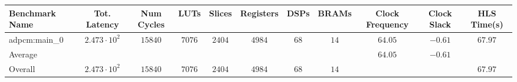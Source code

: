 \begin{tabular}{|l|c|c|c|c|c|c|c|c|c|c|}
\hline
Benchmark Name & Tot. Latency           & Num Cycles & LUTs     & Slices   & Registers & DSPs   & BRAMs  & Clock Frequency & Clock Slack & HLS Time(s) \\
\hline
adpcm:main\_0  & $ 2.473 \cdot 10^{2} $ & $ 15840  $ & $ 7076 $ & $ 2404 $ & $ 4984  $ & $ 68 $ & $ 14 $ & $ 64.05       $ & $ -0.61   $ & $ 67.97   $ \\
\hline
Average        & $                    $ & $        $ & $      $ & $      $ & $       $ & $    $ & $    $ & $ 64.05       $ & $ -0.61   $ & $         $ \\
\hline
Overall        & $ 2.473 \cdot 10^{2} $ & $ 15840  $ & $ 7076 $ & $ 2404 $ & $ 4984  $ & $ 68 $ & $ 14 $ & $             $ & $         $ & $ 67.97   $ \\
\hline
\end{tabular}
